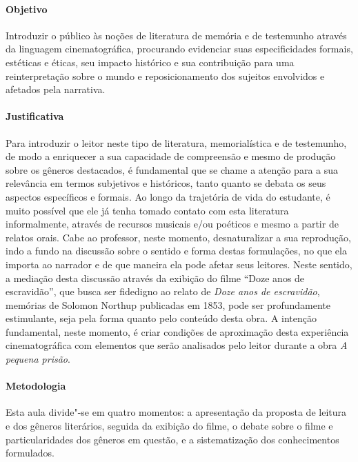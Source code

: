 \documentclass[11pt]{extarticle}
\begin{document}
\paragraph{Objetivo} Introduzir o público às noções de literatura de
memória e de testemunho através da linguagem cinematográfica, procurando
evidenciar suas especificidades formais, estéticas e éticas, seu impacto
histórico e sua contribuição para uma reinterpretação sobre o mundo e
reposicionamento dos sujeitos envolvidos e afetados pela narrativa.

\paragraph{Justificativa} Para introduzir o leitor neste tipo de
literatura, memorialística e de testemunho, de modo a enriquecer a sua
capacidade de compreensão e mesmo de produção sobre os gêneros
destacados, é fundamental que se chame a atenção para a sua relevância
em termos subjetivos e históricos, tanto quanto se debata os seus
aspectos específicos e formais. Ao longo da trajetória de vida do
estudante, é muito possível que ele já tenha tomado contato com esta
literatura informalmente, através de recursos musicais e/ou poéticos e
mesmo a partir de relatos orais. Cabe ao professor, neste momento,
desnaturalizar a sua reprodução, indo a fundo na discussão sobre o
sentido e forma destas formulações, no que ela importa ao narrador e de
que maneira ela pode afetar seus leitores. Neste sentido, a mediação
desta discussão através da exibição do filme ``Doze anos de escravidão'',
que busca ser fidedigno ao relato de \emph{Doze anos de escravidão},
memórias de Solomon Northup publicadas em 1853, pode ser profundamente
estimulante, seja pela forma quanto pelo conteúdo desta obra. A intenção
fundamental, neste momento, é criar condições de aproximação desta
experiência cinematográfica com elementos que serão analisados pelo
leitor durante a obra \emph{A pequena prisão}.

\paragraph{Metodologia} Esta aula divide"-se em quatro momentos: a
apresentação da proposta de leitura e dos gêneros literários, seguida da
exibição do filme, o debate sobre o filme e particularidades dos
gêneros em questão, e a sistematização dos conhecimentos formulados.
\end{document}
